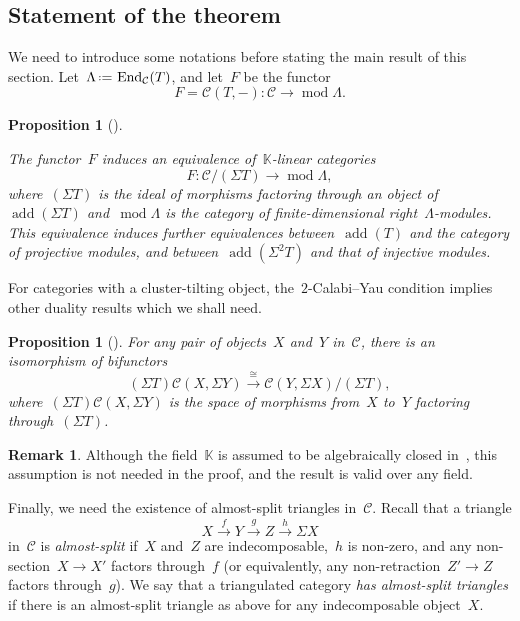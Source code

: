 \documentclass{amsart}
\newtheorem{proposition}[theorem]{Proposition}
\theoremstyle{definition}
\newtheorem{remark}[theorem]{Remark}
\newcommand{\eqdef}{\mbox{\,\raisebox{0.2ex}{\scriptsize\ensuremath{\mathrm:}}\ensuremath{=}\,}} %
\newcommand{\darkblue}{\color{darkblue}} %
\newcommand{\defn}[1]{\textsl{\darkblue #1}} %
\newcommand{\field}{\mathbb{K}}
\newcommand{\cat}{\mathcal{C}}
\newcommand{\susp}{\Sigma}
\newcommand{\add}{\operatorname{add}}
\newcommand{\MOD}{\operatorname{mod}}
\newcommand{\End}[1]{\operatorname{End}_{#1}}
\begin{document}

\subsection{Statement of the theorem}
\label{subsec:Statement cluster cats}

We need to introduce some notations before stating the main result of this section. Let~$\Lambda\eqdef \End{\cat}(T)$, and let~$F$ be the functor
\[
F = \cat(T,-): \cat \xrightarrow{} \MOD \Lambda.
\]

\begin{proposition}[\cite{BuanMarshReiten, KellerReiten}]\label{prop:functor-F}

The functor~$F$ induces an equivalence of~$\field$-linear categories
\[
 F:\cat/(\susp T) \xrightarrow{} \MOD \Lambda,
\]
where~$(\susp T)$ is the ideal of morphisms factoring through an object of~$\add(\susp T)$ and~$\MOD \Lambda$ is the category of finite-dimensional right~$\Lambda$-modules. This equivalence induces further equivalences between~$\add(T)$ and the category of projective modules, and between~$\add(\susp^2 T)$ and that of injective modules.
\end{proposition}

For categories with a cluster-tilting object, the~$2$-Calabi--Yau condition implies other duality results which we shall need.

\begin{proposition}[\cite{Palu}]
For any pair of objects~$X$ and~$Y$ in~$\cat$, there is an isomorphism of bifunctors
\[
(\susp T)\cat(X, \susp Y) \xrightarrow{\cong} \cat(Y, \susp X)/(\susp T),
\]
where~$(\susp T)\cat(X, \susp Y)$ is the space of morphisms from~$X$ to~$Y$ factoring through~$(\susp T)$.
\end{proposition}

\begin{remark}
Although the field~$\field$ is assumed to be algebraically closed in~\cite{Palu}, this assumption is not needed in the proof, and the result is valid over any field.
\end{remark}

Finally, we need the existence of almost-split triangles in~$\cat$. Recall that a triangle
\[
X\xrightarrow{f} Y \xrightarrow{g} Z \xrightarrow{h} \susp X
\]
in~$\cat$ is \defn{almost-split} if~$X$ and~$Z$ are indecomposable,~$h$ is non-zero, and any non-section~$X\to X'$ factors through~$f$  (or equivalently, any non-retraction~$Z'\to Z$ factors through~$g$). We say that a triangulated category \defn{has almost-split triangles} if there is an almost-split triangle as above for any indecomposable object~$X$. 
\end{document}
